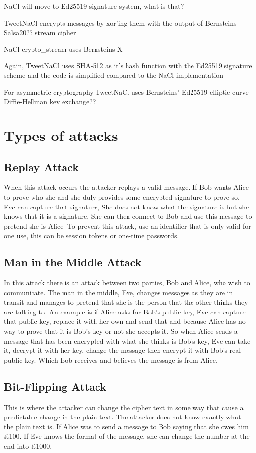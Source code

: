 NaCl will move to Ed25519 signature system, what is that?

TweetNaCl encrypts messages by xor'ing them with the output of Bernsteins Salsa20?? stream cipher

NaCl crypto\_stream uses Bernsteins X

Again, TweetNaCl uses SHA-512 as it's hash function with the Ed25519 signature scheme and the code is simplified compared to the NaCl implementation

For asymmetric cryptography TweetNaCl uses Bernsteins' Ed25519 elliptic curve Diffie-Hellman key exchange?? 


\section{Types of attacks}

\subsection{Replay Attack}
When this attack occurs the attacker replays a valid message. If Bob wants Alice to prove who she and she duly provides some encrypted signature to prove so. Eve can capture that signature, She does not know what the signature is but she knows that it is a signature. She can then connect to Bob and use this message to pretend she is Alice. To prevent this attack, use an identifier that is only valid for one use, this can be session tokens or one-time passwords. 

\subsection{Man in the Middle Attack}
In this attack there is an attack between two parties, Bob and Alice, who wish to communicate. The man in the middle, Eve, changes messages as they are in transit and manages to pretend that she is the person that the other thinks they are talking to. An example is if Alice asks for Bob's public key, Eve can capture that public key, replace it with her own and send that and because Alice has no way to prove that it is Bob's key or not she accepts it. So when Alice sends a message that has been encrypted with what she thinks is Bob's key, Eve can take it, decrypt it with her key, change the message then encrypt it with Bob's real public key. Which Bob receives and believes the message is from Alice.

\subsection{Bit-Flipping Attack}
This is where the attacker can change the cipher text in some way that cause a predictable change in the plain text. The attacker does not know exactly what the plain text is. If Alice was to send a message to Bob saying that she owes him £100. If Eve knows the format of the message, she can change the number at the end into £1000. 

